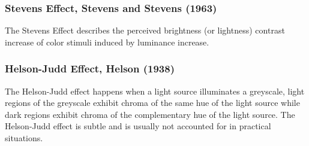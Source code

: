 \subsubsection{Stevens Effect, Stevens and Stevens (1963)}
\label{subsubsec:stevens-effect-stevens-and-stevens-1963}

The Stevens Effect describes the perceived brightness (or lightness) contrast increase of color stimuli induced by luminance increase.

\subsubsection{Helson-Judd Effect, Helson (1938)}
\label{subsubsec:helson-judd-effect-helson-1938}

The Helson-Judd effect happens when a light source illuminates a greyscale, light regions of the greyscale exhibit chroma of the same hue of the light source while dark regions exhibit chroma of the complementary hue of the light source. The Helson-Judd effect is subtle and is usually not accounted for in practical situations.

